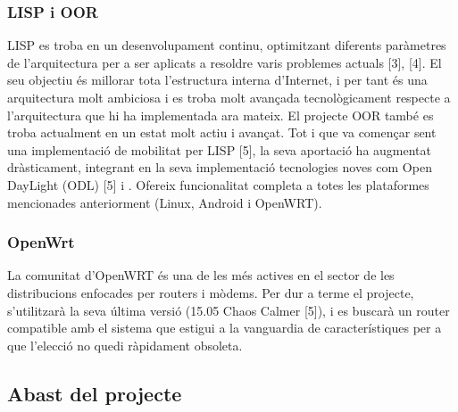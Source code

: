 \documentclass{article}
\begin{document}
\subsubsection{LISP i OOR}
LISP es troba en un desenvolupament continu, optimitzant diferents paràmetres de l’arquitectura per a ser aplicats a resoldre varis problemes actuals [3], [4]. El seu objectiu és millorar tota l’estructura interna d’Internet, i per tant és una arquitectura molt ambiciosa i es troba molt avançada tecnològicament respecte a l’arquitectura que hi ha implementada ara mateix. 
El projecte OOR també es troba actualment en un estat molt actiu i avançat. Tot i que va començar sent una implementació de mobilitat per LISP [5], la seva aportació ha augmentat dràsticament, integrant en la seva implementació tecnologies noves com Open DayLight (ODL) [5] i . Ofereix funcionalitat completa a totes les plataformes mencionades anteriorment (Linux, Android i OpenWRT).
\subsubsection{OpenWrt}
La comunitat d’OpenWRT és una de les més actives en el sector de les distribucions enfocades per routers i mòdems. Per dur a terme el projecte, s’utilitzarà la seva última versió (15.05 Chaos Calmer [5]), i es buscarà un router compatible amb el sistema que estigui a la vanguardia de característiques per a que l’elecció no quedi ràpidament obsoleta.

\subsection{Abast del projecte}
\end{document}
